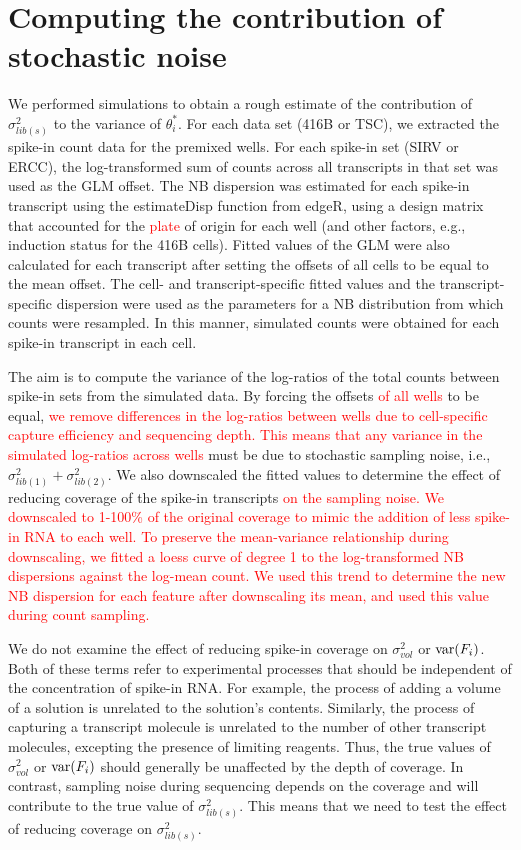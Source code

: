 \documentclass{article}
\newcommand\revised[1]{\textcolor{red}{#1}}
\begin{document}
\section{Computing the contribution of stochastic noise}
We performed simulations to obtain a rough estimate of the contribution of $\sigma^2_{lib(s)}$ to the variance of $\theta^*_i$.
For each data set (416B or TSC), we extracted the spike-in count data for the premixed wells.
For each spike-in set (SIRV or ERCC), the log-transformed sum of counts across all transcripts in that set was used as the GLM offset. 
The NB dispersion was estimated for each spike-in transcript using the estimateDisp function from edgeR, using a design matrix that accounted for the \revised{plate} of origin for each well (and other factors, e.g., induction status for the 416B cells).
Fitted values of the GLM were also calculated for each transcript after setting the offsets of all cells to be equal to the mean offset.
The cell- and transcript-specific fitted values and the transcript-specific dispersion were used as the parameters for a NB distribution from which counts were resampled.
In this manner, simulated counts were obtained for each spike-in transcript in each cell.

The aim is to compute the variance of the log-ratios of the total counts between spike-in sets from the simulated data.
By forcing the offsets \revised{of all wells} to be equal, \revised{we remove differences in the log-ratios between wells due to cell-specific capture efficiency and sequencing depth.
This means that any variance in the simulated log-ratios across wells} must be due to stochastic sampling noise, i.e.,  $\sigma^2_{lib(1)} + \sigma^2_{lib(2)}$.
We also downscaled the fitted values to determine the effect of reducing coverage of the spike-in transcripts \revised{on the sampling noise.
We downscaled to 1-100\% of the original coverage to mimic the addition of less spike-in RNA to each well.}
\revised{To preserve the mean-variance relationship during downscaling, we fitted a loess curve of degree 1 to the log-transformed NB dispersions against the log-mean count.
We used this trend to determine the new NB dispersion for each feature after downscaling its mean, and used this value during count sampling.}

We do not examine the effect of reducing spike-in coverage on $\sigma^2_{vol}$ or $\mbox{var}(F_i)$.
Both of these terms refer to experimental processes that should be independent of the concentration of spike-in RNA.
For example, the process of adding a volume of a solution is unrelated to the solution's contents.
Similarly, the process of capturing a transcript molecule is unrelated to the number of other transcript molecules, excepting the presence of limiting reagents.
Thus, the true values of $\sigma^2_{vol}$ or $\mbox{var}(F_i)$ should generally be unaffected by the depth of coverage.
In contrast, sampling noise during sequencing depends on the coverage and will contribute to the true value of $\sigma^2_{lib(s)}$.
This means that we need to test the effect of reducing coverage on $\sigma^2_{lib(s)}$.
\end{document}

